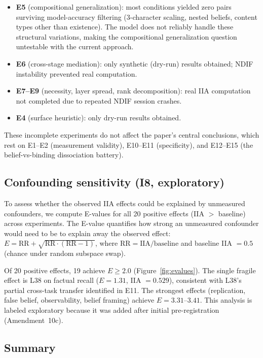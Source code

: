\documentclass[11pt]{article}
\begin{document}
\begin{itemize}
\item \textbf{E5} (compositional generalization): most conditions yielded zero pairs surviving model-accuracy filtering (3-character scaling, nested beliefs, content types other than existence). The model does not reliably handle these structural variations, making the compositional generalization question untestable with the current approach.
\item \textbf{E6} (cross-stage mediation): only synthetic (dry-run) results obtained; NDIF instability prevented real computation.
\item \textbf{E7--E9} (necessity, layer spread, rank decomposition): real IIA computation not completed due to repeated NDIF session crashes.
\item \textbf{E4} (surface heuristic): only dry-run results obtained.
\end{itemize}

These incomplete experiments do not affect the paper's central conclusions, which rest on E1--E2 (measurement validity), E10--E11 (specificity), and E12--E15 (the belief-vs-binding dissociation battery).

\subsection{Confounding sensitivity (I8, exploratory)}

To assess whether the observed IIA effects could be explained by unmeasured confounders, we compute E-values \citep{vanderweele2017sensitivity} for all 20 positive effects (IIA $>$ baseline) across experiments. The E-value quantifies how strong an unmeasured confounder would need to be to explain away the observed effect: $E = \text{RR} + \sqrt{\text{RR} \cdot (\text{RR} - 1)}$, where $\text{RR} = \text{IIA} / \text{baseline}$ and baseline IIA $= 0.5$ (chance under random subspace swap).

Of 20 positive effects, 19 achieve $E \geq 2.0$ (Figure~\ref{fig:evalues}). The single fragile effect is L38 on factual recall ($E = 1.31$, IIA $= 0.529$), consistent with L38's partial cross-task transfer identified in E11. The strongest effects (replication, false belief, observability, belief framing) achieve $E = 3.31$--$3.41$. This analysis is labeled exploratory because it was added after initial pre-registration (Amendment~10c).

\subsection{Summary}
\end{document}
